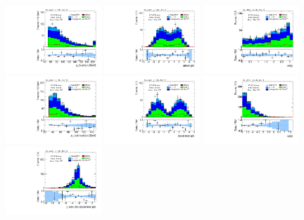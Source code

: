 \clearpage
\begin{figure}[tp]
  \includegraphics[width=0.32\textwidth]{figures/analysis/vbf-topCR/jet-1-pt}
  \includegraphics[width=0.32\textwidth]{figures/analysis/vbf-topCR/jet-1-eta}
  \includegraphics[width=0.32\textwidth]{figures/analysis/vbf-topCR/jets-dphi}
  \includegraphics[width=0.32\textwidth]{figures/analysis/vbf-topCR/jet-2-pt}
  \includegraphics[width=0.32\textwidth]{figures/analysis/vbf-topCR/jet-2-eta}
  \includegraphics[width=0.32\textwidth]{figures/analysis/vbf-topCR/jets-deta}
  \includegraphics[width=0.32\textwidth]{figures/analysis/vbf-topCR/jets-etaprod}

\end{figure}
